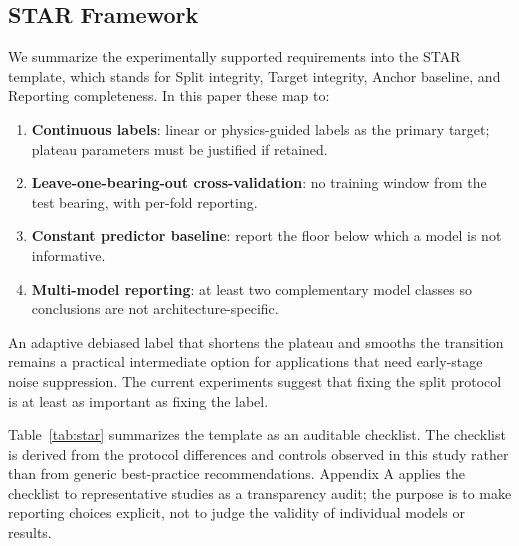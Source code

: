 \documentclass[pdflatex,sn-mathphys-num]{sn-jnl}
\begin{document}
\subsection{STAR Framework}
We summarize the experimentally supported requirements into the STAR template, which stands for Split integrity, Target integrity, Anchor baseline, and Reporting completeness. In this paper these map to:
\begin{enumerate}
    \item \textbf{Continuous labels}: linear or physics-guided labels as the primary target; plateau parameters must be justified if retained.
    \item \textbf{Leave-one-bearing-out cross-validation}: no training window from the test bearing, with per-fold reporting.
    \item \textbf{Constant predictor baseline}: report the floor below which a model is not informative.
    \item \textbf{Multi-model reporting}: at least two complementary model classes so conclusions are not architecture-specific.
\end{enumerate}
An adaptive debiased label that shortens the plateau and smooths the transition remains a practical intermediate option for applications that need early-stage noise suppression. The current experiments suggest that fixing the split protocol is at least as important as fixing the label.

Table~\ref{tab:star} summarizes the template as an auditable checklist. The checklist is derived from the protocol differences and controls observed in this study rather than from generic best-practice recommendations. Appendix A applies the checklist to representative studies as a transparency audit; the purpose is to make reporting choices explicit, not to judge the validity of individual models or results.

\begin{table}[t]
\centering
\caption{STAR evaluation template used as an auditable reporting checklist.}
\label{tab:star}
\small
{}
\end{table}
\end{document}
